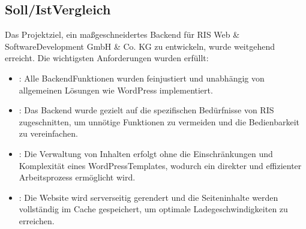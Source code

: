 \documentclass[a4paper,12pt,ngerman]{sphinxmanual}
\begin{document}
\subsection{Soll\sphinxhyphen{}/Ist\sphinxhyphen{}Vergleich}
\label{\detokenize{sections/fazit:soll-ist-vergleich}}
\sphinxAtStartPar
Das Projektziel, ein maßgeschneidertes Backend für RIS Web\sphinxhyphen{} \& Software\sphinxhyphen{}Development GmbH \& Co. KG zu entwickeln, wurde weitgehend erreicht. Die wichtigsten Anforderungen wurden erfüllt:
\begin{itemize}
\item {} 
\sphinxAtStartPar
{}: Alle Backend\sphinxhyphen{}Funktionen wurden feinjustiert und unabhängig von allgemeinen Lösungen wie WordPress implementiert.

\item {} 
\sphinxAtStartPar
{}: Das Backend wurde gezielt auf die spezifischen Bedürfnisse von RIS zugeschnitten, um unnötige Funktionen zu vermeiden und die Bedienbarkeit zu vereinfachen.

\item {} 
\sphinxAtStartPar
{}: Die Verwaltung von Inhalten erfolgt ohne die Einschränkungen und Komplexität eines WordPress\sphinxhyphen{}Templates, wodurch ein direkter und effizienter Arbeitsprozess ermöglicht wird.

\item {} 
\sphinxAtStartPar
{}: Die Website wird serverseitig gerendert und die Seiteninhalte werden vollständig im Cache gespeichert, um optimale Ladegeschwindigkeiten zu erreichen.

\end{itemize}
\end{document}
